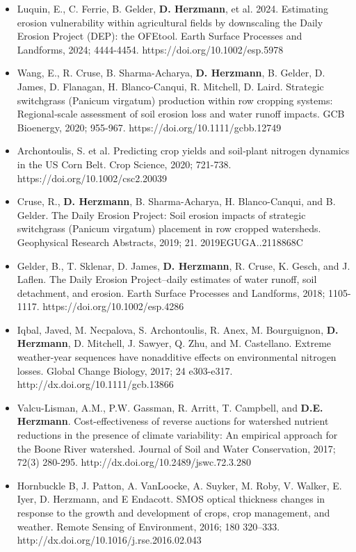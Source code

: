 \documentclass[11pt]{article}
\begin{document}
\begin{itemize}
\item Luquin, E., C. Ferrie, B. Gelder, \textbf{D. Herzmann}, et al. 2024. 
Estimating erosion vulnerability within agricultural fields by downscaling
the Daily Erosion Project (DEP): the OFEtool. Earth Surface Processes and Landforms,
2024; 4444-4454. https://doi.org/10.1002/esp.5978
\item Wang, E., R. Cruse, B. Sharma-Acharya, \textbf{D. Herzmann}, B. Gelder, D. James, D. Flanagan, H. Blanco-Canqui, R. Mitchell, D. Laird. Strategic switchgrass (Panicum virgatum) production within row cropping systems: Regional‐scale assessment of soil erosion loss and water runoff impacts. GCB Bioenergy, 2020; 955-967. https://doi.org/10.1111/gcbb.12749 
\item Archontoulis, S. et al. Predicting crop yields and soil‐plant nitrogen dynamics in the US Corn Belt. Crop Science, 2020; 721-738. https://doi.org/10.1002/csc2.20039
\item Cruse, R., \textbf{D. Herzmann}, B. Sharma-Acharya, H. Blanco-Canqui, and B. Gelder. The Daily Erosion Project: Soil erosion impacts of strategic switchgrass (Panicum virgatum) placement in row cropped watersheds. Geophysical Research Abstracts, 2019; 21. 2019EGUGA..2118868C
\item Gelder, B., T. Sklenar, D. James, \textbf{D. Herzmann}, R. Cruse, K. Gesch, and J. Laflen. The Daily Erosion Project–daily estimates of water runoff, soil detachment, and erosion. Earth Surface Processes and Landforms, 2018; 1105-1117. https://doi.org/10.1002/esp.4286
\item Iqbal, Javed, M. Necpalova, S. Archontoulis, R. Anex, M. Bourguignon, \textbf{D. Herzmann}, D. Mitchell, J. Sawyer, Q. Zhu, and M. Castellano. Extreme weather-year sequences have nonadditive effects on environmental nitrogen losses. Global Change Biology, 2017; 24 e303-e317. http://dx.doi.org/10.1111/gcb.13866
\item Valcu-Lisman, A.M., P.W. Gassman, R. Arritt, T. Campbell, and \textbf{D.E. Herzmann}. Cost-effectiveness of reverse auctions for watershed nutrient reductions in the presence of climate variability: An empirical approach for the Boone River watershed. Journal of Soil and Water Conservation, 2017; 72(3) 280-295. http://dx.doi.org/10.2489/jswc.72.3.280
\item Hornbuckle B, J. Patton, A. VanLoocke, A. Suyker, M. Roby, V. Walker, E. Iyer, D. Herzmann, and E Endacott. SMOS optical thickness changes in response to the growth and development of crops, crop management, and weather. Remote Sensing of Environment, 2016; 180 320–333. http://dx.doi.org/10.1016/j.rse.2016.02.043

\end{itemize}
\end{document}

